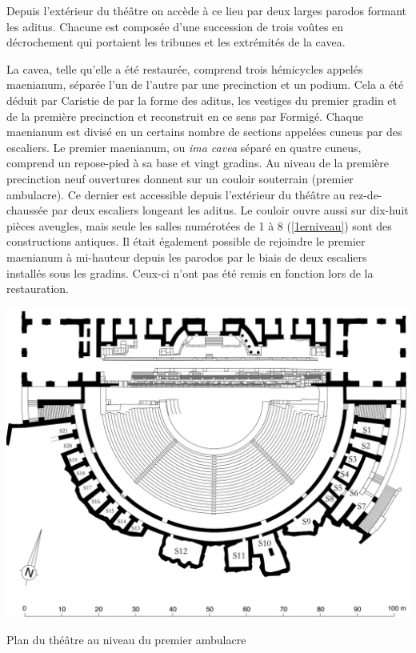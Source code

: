 Depuis l'extérieur du théâtre on accède à ce lieu par deux larges \gls{parodos} formant les \gls{aditus}. Chacune est composée d'une succession de trois voûtes en décrochement qui portaient les tribunes et les extrémités de la  \gls{cavea}.
	
		La  \gls{cavea}, telle qu'elle a été restaurée, comprend trois hémicycles appelés \gls{maenianum}, séparée l'un de l'autre par une \gls{precinction} et un \gls{podium}. Cela a été déduit par Caristie de par la forme des \gls{aditus}, les vestiges du premier gradin et de la première \gls{precinction} et reconstruit en ce sens par Formigé. Chaque \gls{maenianum} est divisé en un certains nombre de sections appelées \gls{cuneus} par des escaliers.
Le premier \gls{maenianum}, ou \textit{ima cavea} séparé en quatre \gls{cuneus}, comprend un repose-pied à sa base et vingt gradins. Au niveau de la première \gls{precinction} neuf ouvertures donnent  sur un couloir souterrain (premier \gls{ambulacre}). Ce dernier est accessible depuis l'extérieur du théâtre au rez-de-chaussée par deux escaliers longeant les \gls{aditus}. Le couloir ouvre aussi sur dix-huit pièces aveugles, mais seule les salles numérotées de 1 à 8 (\ref{1erniveau}) sont des constructions antiques. Il était également possible de rejoindre le premier \gls{maenianum} à mi-hauteur depuis les \gls{parodos} par le biais de deux escaliers installés sous les gradins. Ceux-ci n'ont pas été remis en fonction lors de la restauration.
		
	\begin{figureth}
		\includegraphics[width=\linewidth]{images/1erniveau}
		\caption[Vue de dessus - 1er niveau]{Plan du théâtre au niveau du premier ambulacre \cite[Pl. XVII]{orangePl}}
		\label{1erniveau}
	\end{figureth}		
		
